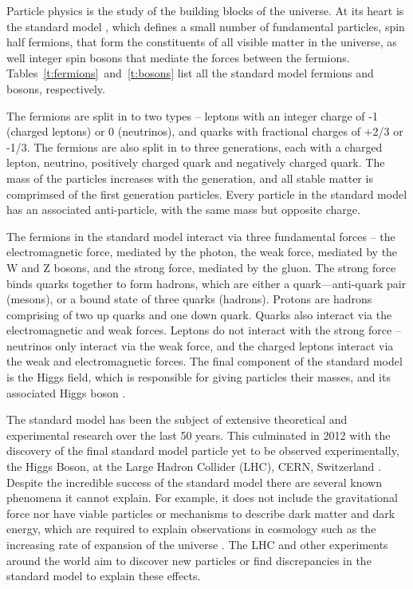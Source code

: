 

Particle physics is the study of the building blocks of the universe. At its heart is the standard model \cite{standMod}, which defines a small number of fundamental particles, spin half fermions, that form the constituents of all visible matter in the universe, as well integer spin bosons that mediate the forces between the fermions. Tables~\ref{t:fermions}~and~\ref{t:bosons} list all the standard model fermions and bosons, respectively. 

The fermions are split in to two types -- leptons with an integer charge of -1 (charged leptons) or 0 (neutrinos), and quarks with fractional charges of +2/3 or -1/3. The fermions are also split in to three generations, each with a charged lepton, neutrino, positively charged quark and negatively charged quark. The mass of the particles increases with the generation, and all stable matter is comprimsed of the first generation particles. Every particle in the standard model has an associated anti-particle, with the same mass but opposite charge. 

The fermions in the standard model interact via three fundamental forces -- the electromagnetic force, mediated by the photon, the weak force, mediated by the W and Z bosons, and the strong force, mediated by the gluon. The strong force binds quarks together to form hadrons, which are either a quark---anti-quark pair (mesons), or a bound state of three quarks (hadrons). Protons are hadrons comprising of two up quarks and one down quark. Quarks also interact via the electromagnetic and weak forces. Leptons do not interact with the strong force -- neutrinos only interact via the weak force, and the charged leptons interact via the weak and electromagnetic forces. The final component of the standard model is the Higgs field,  which is responsible for giving particles their masses, and its associated Higgs boson \cite{higgsPap}.

The standard model has been the subject of extensive theoretical and experimental research over the last 50 years. This culminated in 2012 with the discovery of the final standard model particle yet to be observed experimentally, the Higgs Boson, at the Large Hadron Collider (LHC), CERN, Switzerland \cite{higgsATLAS,higgsCMS}. Despite the incredible success of the standard model there are several known phenomena it cannot explain. For example, it does not include the gravitational force nor have viable particles or mechanisms to describe dark matter and dark energy, which are required to explain observations in cosmology such as the increasing rate of expansion of the universe \cite{darkEn}. The LHC and other experiments around the world aim to discover new particles or find discrepancies in the standard model to explain these effects.


